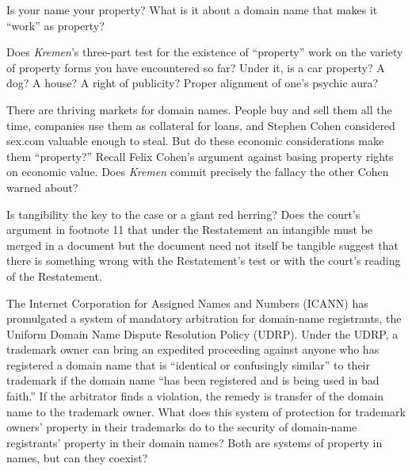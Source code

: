 \item Is your name your property? What is it about a domain name that makes it
``work'' as property?

\item Does \textit{Kremen}'s three-part test for the existence of ``property''
work on the variety of property forms you have encountered so far? Under it, is
a car property? A dog? A house? A right of publicity? Proper alignment of one's
psychic aura?

\item There are thriving markets for domain names. People buy and sell them all
the time, companies use them as collateral for loans, and Stephen Cohen
considered sex.com valuable enough to steal. But do these economic
considerations make them ``property?'' Recall Felix Cohen's argument against
basing property rights on economic value. Does \textit{Kremen} commit precisely
the fallacy the other Cohen warned about?

\item Is tangibility the key to the case or a giant red herring? Does the
court's argument in footnote 11 that under the Restatement an intangible must
be merged in a document but the document need not itself be tangible suggest
that there is something wrong with the Restatement's test or with the court's
reading of the Restatement.

\item The Internet Corporation for Assigned Names and Numbers (ICANN) has
promulgated a system of mandatory arbitration for domain-name registrants, the
Uniform Domain Name Dispute Resolution Policy (UDRP). Under the UDRP, a
trademark owner can bring an expedited proceeding against anyone who has
registered a domain name that is ``identical or confusingly similar'' to their
trademark if the domain name ``has been registered and is being used in bad
faith.'' If the arbitrator finds a violation, the remedy is transfer of the
domain name to the trademark owner. What does this system of protection for
trademark owners' property in their trademarks do to the security of
domain-name registrants' property in their domain names? Both are systems of
property in names, but can they coexist?

